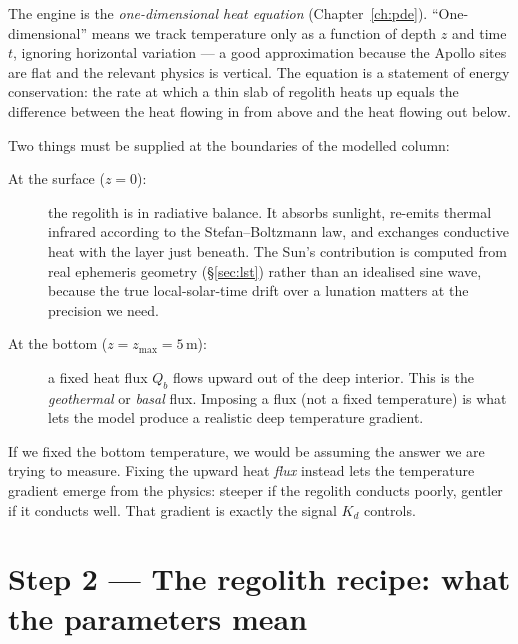 \documentclass[11pt]{report}
\begin{document}
The engine is the \emph{one-dimensional heat equation}
(Chapter~\ref{ch:pde}). ``One-dimensional'' means we track
temperature only as a function of depth $z$ and time $t$, ignoring
horizontal variation --- a good approximation because the Apollo
sites are flat and the relevant physics is vertical. The equation is
a statement of energy conservation: the rate at which a thin slab of
regolith heats up equals the difference between the heat flowing in
from above and the heat flowing out below.

Two things must be supplied at the boundaries of the modelled
column:

\begin{description}
\item[At the surface ($z=0$):] the regolith is in radiative balance.
  It absorbs sunlight, re-emits thermal infrared according to the
  Stefan--Boltzmann law, and exchanges conductive heat with the
  layer just beneath. The Sun's contribution is computed from real
  ephemeris geometry (\S\ref{sec:lst}) rather than an idealised
  sine wave, because the true local-solar-time drift over a lunation
  matters at the precision we need.
\item[At the bottom ($z=z_\mathrm{max}=5$\,m):] a fixed heat flux
  $Q_b$ flows upward out of the deep interior. This is the
  \emph{geothermal} or \emph{basal} flux. Imposing a flux (not a
  fixed temperature) is what lets the model produce a realistic
  deep temperature gradient.
\end{description}

\begin{aside}
If we fixed the bottom temperature, we would be assuming the answer
we are trying to measure. Fixing the upward heat \emph{flux}
instead lets the temperature gradient emerge from the physics:
steeper if the regolith conducts poorly, gentler if it conducts
well. That gradient is exactly the signal $K_d$ controls.
\end{aside}

\section{Step 2 --- The regolith recipe: what the parameters mean}
\end{document}
